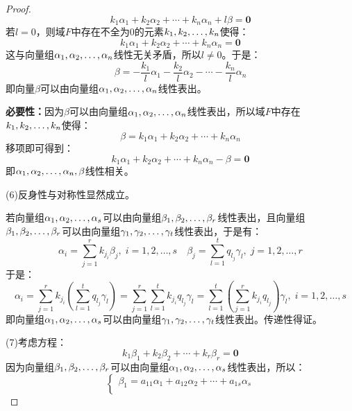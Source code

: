 \begin{proof}
	\begin{equation*}
		k_1\alpha_1+k_2\alpha_2+\cdots+k_n\alpha_n+l\beta=\mathbf{0}
	\end{equation*}
	若$l=0$，则域$F$中存在不全为$0$的元素$k_1, k_2, \dots, k_{n}$使得：
	\begin{equation*}
		k_1\alpha_1+k_2\alpha_2+\cdots+k_n\alpha_n=\mathbf{0}
	\end{equation*}
	这与向量组$\alpha_1, \alpha_2, \dots, \alpha_{n}$线性无关矛盾，所以$l\ne0$。于是：
	\begin{equation*}
		\beta=-\frac{k_1}{l}\alpha_1-\frac{k_2}{l}\alpha_2-\cdots-\frac{k_n}{l}\alpha_n
	\end{equation*}
	即向量$\beta$可以由向量组$\alpha_1, \alpha_2, \dots, \alpha_{n}$线性表出。\par
	\textbf{必要性：}因为$\beta$可以由向量组$\alpha_1, \alpha_2, \dots, \alpha_{n}$线性表出，所以域$F$中存在$k_1, k_2, \dots, k_{n}$使得：
	\begin{equation*}
		\beta=k_1\alpha_1+k_2\alpha_2+\cdots+k_n\alpha_n
	\end{equation*}
	移项即可得到：
	\begin{equation*}
		k_1\alpha_1+k_2\alpha_2+\cdots+k_n\alpha_n-\beta=\mathbf{0}
	\end{equation*}
	即$\alpha_1, \alpha_2, \dots, \alpha_{n},\beta$线性相关。\par
	(6)反身性与对称性显然成立。\par
	若向量组$\alpha_1, \alpha_2, \dots, \alpha_{s}$可以由向量组$\beta_1, \beta_2, \dots, \beta_{r}$线性表出，且向量组$\beta_1, \beta_2, \dots, \beta_{r}$可以由向量组$\gamma_1, \gamma_2, \dots, \gamma_{t}$线性表出，于是有：
	\begin{equation*}
		\alpha_i=\sum_{j=1}^{r}k_{j_i}\beta_j,\;i=1,2,\dots,s\quad
		\beta_j=\sum_{l=1}^{t}q_{l_j}\gamma_l,\;j=1,2,\dots,r
	\end{equation*}
	于是：
	\begin{equation*}
		\alpha_i=\sum_{j=1}^{r}k_{j_i}\left(\sum_{l=1}^{t}q_{l_j}\gamma_l\right)=\sum_{j=1}^{r}\sum_{l=1}^{t}k_{j_i}q_{l_j}\gamma_l=\sum_{l=1}^{t}\left(\sum_{j=1}^{r}k_{j_i}q_{l_j}\right)\gamma_l,\;i=1,2,\dots,s
	\end{equation*}
	即向量组$\alpha_1, \alpha_2, \dots, \alpha_{s}$可以由向量组$\gamma_1, \gamma_2, \dots, \gamma_{t}$线性表出。传递性得证。\par
	(7)考虑方程：
	\begin{equation*}
		k_1\beta_1+k_2\beta_2+\cdots+k_r\beta_r=\mathbf{0}
	\end{equation*}
	因为向量组$\beta_1, \beta_2, \dots, \beta_{r}$可以由向量组$\alpha_1, \alpha_2, \dots, \alpha_{s}$线性表出，所以：
	\begin{equation*}
		\begin{cases}
			\beta_1=a_{11}\alpha_1+a_{12}\alpha_2+\cdots+a_{1s}\alpha_s \\

\end{cases}
\end{equation*}
\end{proof}
